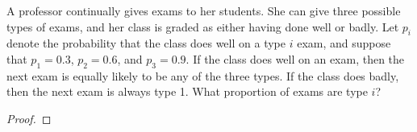 \begin{problem}{4.33}
  A professor continually gives exams to her students. She can give three possible types
  of exams, and her class is graded as either having done well or badly. Let $p_i$
  denote the probability that the class does well on a type $i$ exam, and suppose that
  $p_1 = 0.3$, $p_2 = 0.6$, and $p_3 = 0.9$. If the class does well on an exam,
  then the next exam is equally likely to be any of the three types. If the class
  does badly, then the next exam is always type 1. What proportion of exams
  are type $i$?
\end{problem}

\begin{proof}
\end{proof}
\newpage
